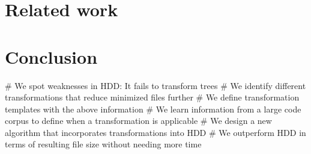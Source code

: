 \documentclass[numbers]{sigplanconf}
\begin{document}
\section{Related work}
\label{sec_related-work}

\section{Conclusion}
\label{sec_conclusion}

\begin{easylist}[itemize]
# We spot weaknesses in HDD: It fails to transform trees
# We identify different transformations that reduce minimized files further
# We define transformation templates with the above information
# We learn information from a large code corpus to define when a transformation is applicable
# We design a new algorithm that incorporates transformations into HDD
# We outperform HDD in terms of resulting file size without needing more time
\end{easylist}



\end{document}

